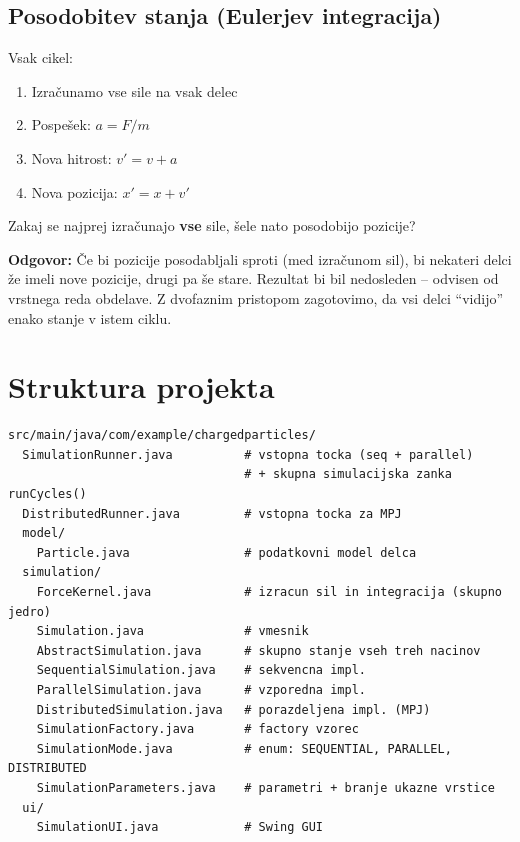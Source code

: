\documentclass[12pt,a4paper]{article}
\begin{document}
\subsection{Posodobitev stanja (Eulerjev integracija)}

Vsak cikel:
\begin{enumerate}
    \item Izra\v{c}unamo vse sile na vsak delec
    \item Pospe\v{s}ek: $a = F / m$
    \item Nova hitrost: $v' = v + a$
    \item Nova pozicija: $x' = x + v'$
\end{enumerate}

\begin{vprasanje}
Zakaj se najprej izra\v{c}unajo \textbf{vse} sile, \v{s}ele nato posodobijo pozicije?

\textbf{Odgovor:} \v{C}e bi pozicije posodabljali sproti (med izra\v{c}unom sil), bi nekateri delci \v{z}e imeli nove pozicije, drugi pa \v{s}e stare. Rezultat bi bil nedosleden -- odvisen od vrstnega reda obdelave. Z dvofaznim pristopom zagotovimo, da vsi delci ``vidijo'' enako stanje v istem ciklu.
\end{vprasanje}

\section{Struktura projekta}

\begin{verbatim}
src/main/java/com/example/chargedparticles/
  SimulationRunner.java          # vstopna tocka (seq + parallel)
                                 # + skupna simulacijska zanka runCycles()
  DistributedRunner.java         # vstopna tocka za MPJ
  model/
    Particle.java                # podatkovni model delca
  simulation/
    ForceKernel.java             # izracun sil in integracija (skupno jedro)
    Simulation.java              # vmesnik
    AbstractSimulation.java      # skupno stanje vseh treh nacinov
    SequentialSimulation.java    # sekvencna impl.
    ParallelSimulation.java      # vzporedna impl.
    DistributedSimulation.java   # porazdeljena impl. (MPJ)
    SimulationFactory.java       # factory vzorec
    SimulationMode.java          # enum: SEQUENTIAL, PARALLEL, DISTRIBUTED
    SimulationParameters.java    # parametri + branje ukazne vrstice
  ui/
    SimulationUI.java            # Swing GUI
\end{verbatim}
\end{document}
